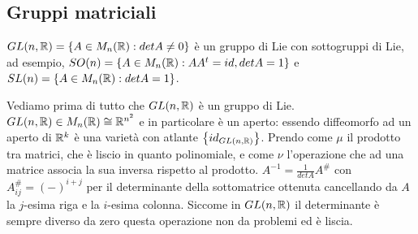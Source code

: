 \subsection{Gruppi matriciali}
$GL(n,\mathbb{R})=\left\{ A\in M_n(\mathbb{R}): detA\neq0 \right\}$ è un gruppo di
Lie con sottogruppi di Lie, ad esempio, $SO(n)=\left\{ A\in
M_n(\mathbb{R}): AA^t=id, detA=1 \right\}$ e 
$SL(n)=\left\{ A\in M_n(\mathbb{R}): detA=1 \right\}$.

Vediamo prima di tutto che $GL(n,\mathbb{R})$ è un gruppo di Lie.
$GL(n,\mathbb{R})\in M_n(\mathbb{R})\cong\mathbb{R}^{n^2}$ e in particolare è un aperto:
essendo diffeomorfo ad un aperto di $\mathbb{R}^k$ è una varietà con
atlante $\left\{ id_{GL(n,\mathbb{R})} \right\}$. Prendo come $\mu$ il
prodotto tra matrici, che è liscio in quanto polinomiale, e come
$\nu$ l'operazione che ad una matrice associa la sua inversa
rispetto al prodotto. $A^{-1}=\frac{1}{detA}A^{\#}$ con
$A^{\#}_{ij}=(-)^{i+j}$ per il determinante della sottomatrice
ottenuta cancellando da $A$ la $j$-esima riga e la $i$-esima
colonna. Siccome in $GL(n,\mathbb{R})$ il determinante è sempre diverso da
zero questa operazione non da problemi ed è liscia.
